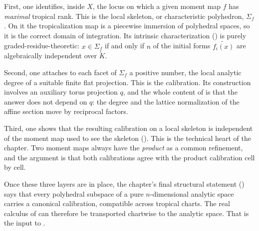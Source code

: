 First, one identifies, inside $X$, the locus on which a given moment map
$f$ has \emph{maximal} tropical rank. This is the local skeleton, or
characteristic polyhedron, $\Sigma_f$. On it the
tropicalization map is a piecewise immersion of polyhedral spaces, so it is
the correct domain of integration. Its intrinsic characterization
() is purely graded-residue-theoretic:
$x\in\Sigma_f$ if and only if $n$ of the initial forms
$\widetilde{f_i(x)}$ are algebraically independent over $\widetilde K$.

Second, one attaches to each facet of $\Sigma_f$ a positive number, the
local analytic degree of a suitable finite flat projection. This is the
calibration. Its construction involves an auxiliary torus projection $q$,
and the whole content of  is that the
answer does not depend on $q$: the degree and the lattice normalization of
the affine section move by reciprocal factors.

Third, one shows that the resulting calibration on a local skeleton is
independent of the moment map used to see the skeleton
(). This is the technical heart
of the chapter. Two moment maps always have the \emph{product} as a common
refinement, and the argument is that both
calibrations agree with the product calibration cell by cell.

Once these three layers are in place, the chapter's final structural
statement () says that every polyhedral
subspace of a pure $n$-dimensional analytic space carries a canonical
calibration, compatible across tropical charts.  The real calculus of
 can
therefore be transported chartwise to the analytic space. That is the input to
.

